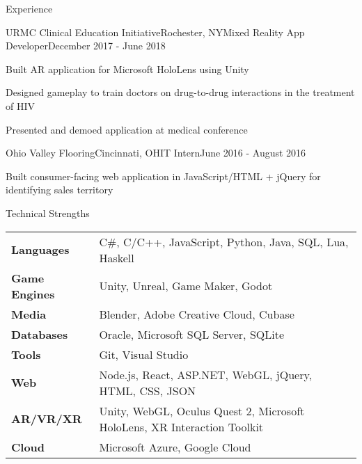 \documentclass{resume} %
\begin{document}
\begin{rSection}{Experience}

\begin{rSubsection}{URMC Clinical Education Initiative}{Rochester, NY}{Mixed Reality App Developer}{December 2017 - June 2018}
\item Built AR application for Microsoft HoloLens using Unity
\item Designed gameplay to train doctors on drug-to-drug interactions in the treatment of HIV
\item Presented and demoed application at medical conference
\end{rSubsection}


\begin{rSubsection}{Ohio Valley Flooring}{Cincinnati, OH}{IT Intern}{June 2016 - August 2016}
\item Built consumer-facing web application in JavaScript/HTML + jQuery for identifying sales territory
\end{rSubsection}

\end{rSection}

\newpage


\begin{rSection}{Technical Strengths}

\begin{tabular}{ @{} >{\bfseries}l @{\hspace{6ex}} l }
Languages		& C\#, C/C++, JavaScript, Python, Java, SQL, Lua, Haskell \\
Game Engines	& Unity, Unreal, Game Maker, Godot \\
Media			& Blender, Adobe Creative Cloud, Cubase \\
Databases		& Oracle, Microsoft SQL Server, SQLite \\
Tools			& Git, Visual Studio \\
Web				& Node.js, React, ASP.NET, WebGL, jQuery, HTML, CSS, JSON \\
AR/VR/XR		& Unity, WebGL, Oculus Quest 2, Microsoft HoloLens, XR Interaction Toolkit \\
Cloud			& Microsoft Azure, Google Cloud
\end{tabular}

\end{rSection}
\end{document}
